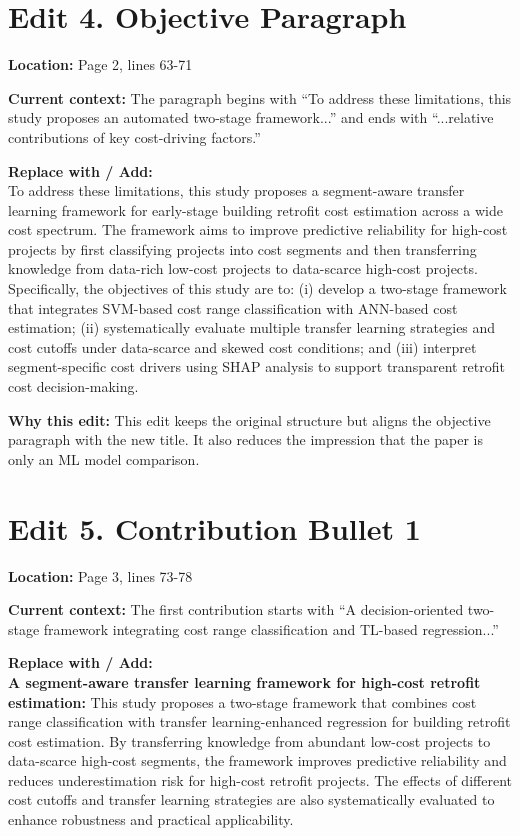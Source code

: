 \documentclass[11pt]{article}
\newcommand{\loc}[1]{\textbf{Location:} #1}
\newcommand{\current}[1]{\textbf{Current context:} #1}
\newcommand{\replacewith}[1]{\textbf{Replace with / Add:}\\{\color{blue}#1}}
\newcommand{\why}[1]{\textbf{Why this edit:} #1}
\begin{document}
\section*{Edit 4. Objective Paragraph}
\loc{Page 2, lines 63-71}

\current{The paragraph begins with ``To address these limitations, this study proposes an automated two-stage framework...'' and ends with ``...relative contributions of key cost-driving factors.''}

\replacewith{To address these limitations, this study proposes a segment-aware transfer learning framework for early-stage building retrofit cost estimation across a wide cost spectrum. The framework aims to improve predictive reliability for high-cost projects by first classifying projects into cost segments and then transferring knowledge from data-rich low-cost projects to data-scarce high-cost projects. Specifically, the objectives of this study are to: (i) develop a two-stage framework that integrates SVM-based cost range classification with ANN-based cost estimation; (ii) systematically evaluate multiple transfer learning strategies and cost cutoffs under data-scarce and skewed cost conditions; and (iii) interpret segment-specific cost drivers using SHAP analysis to support transparent retrofit cost decision-making.}

\why{This edit keeps the original structure but aligns the objective paragraph with the new title. It also reduces the impression that the paper is only an ML model comparison.}

\section*{Edit 5. Contribution Bullet 1}
\loc{Page 3, lines 73-78}

\current{The first contribution starts with ``A decision-oriented two-stage framework integrating cost range classification and TL-based regression...''}

\replacewith{\textbf{A segment-aware transfer learning framework for high-cost retrofit estimation:} This study proposes a two-stage framework that combines cost range classification with transfer learning-enhanced regression for building retrofit cost estimation. By transferring knowledge from abundant low-cost projects to data-scarce high-cost segments, the framework improves predictive reliability and reduces underestimation risk for high-cost retrofit projects. The effects of different cost cutoffs and transfer learning strategies are also systematically evaluated to enhance robustness and practical applicability.}
\end{document}
